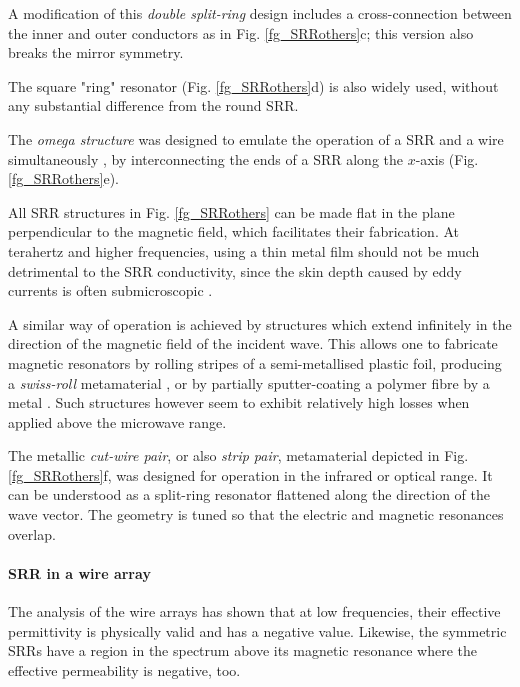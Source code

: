 A modification of this \textit{double split-ring} design includes a cross-connection between the inner and outer conductors as in Fig. \ref{fg_SRRothers}c; this version also breaks the mirror symmetry. 

The square "ring" resonator (Fig. \ref{fg_SRRothers}d) is also widely used, without any substantial difference from the round SRR.

The \textit{omega structure} was designed to emulate the operation of a SRR and a wire simultaneously \cite[pp. 62--72]{croenne2009controle}, by interconnecting the ends of a SRR along the $x$-axis (Fig. \ref{fg_SRRothers}e).

All SRR structures in Fig. \ref{fg_SRRothers} can be made flat in the plane perpendicular to the magnetic field, which facilitates their fabrication. At terahertz and higher frequencies, using a thin metal film should not be much detrimental to the SRR conductivity, since the skin depth caused by eddy currents is often submicroscopic \cite{gibbons2010scalable}.

A similar way of operation is achieved by structures which extend infinitely in the direction of the magnetic field of the incident wave. This allows one to fabricate magnetic resonators by rolling stripes of a semi-metallised plastic foil, producing a \textit{swiss-roll} metamaterial \cite{gibbons2010scalable}, or by partially sputter-coating a polymer fibre by a metal \cite{wang2011fiber}. Such structures however seem to exhibit relatively high losses when applied above the microwave range.

The metallic \textit{cut-wire pair}, or also \textit{strip pair}, metamaterial depicted in Fig. \ref{fg_SRRothers}f, was designed for operation in the infrared or optical range. It can be understood as a split-ring resonator flattened along the direction of the wave vector. The geometry is tuned so that the electric and magnetic resonances overlap.	

\paragraph{SRR in a wire array} %
The analysis of the wire arrays has shown that at low frequencies, their effective permittivity is physically valid and has a negative value. Likewise, the symmetric SRRs have a region in the spectrum above its magnetic resonance where the effective permeability is negative, too.

